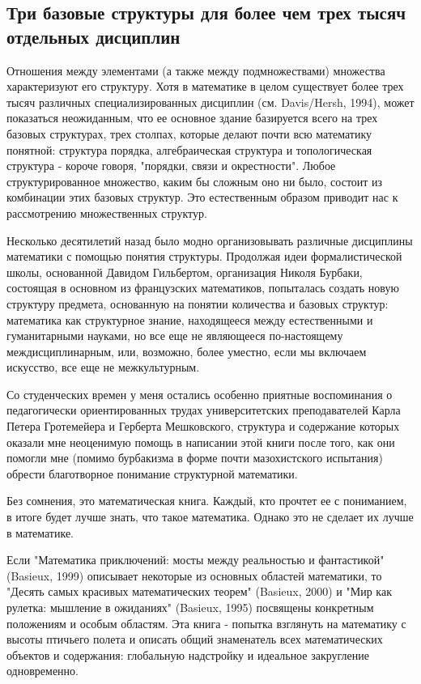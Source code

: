 \subsection{Три базовые структуры для более чем трех тысяч отдельных дисциплин}
Отношения между элементами (а также между подмножествами) множества характеризуют его структуру. Хотя в математике в целом существует более трех тысяч различных специализированных дисциплин (см. Davis/Hersh, 1994), может показаться неожиданным, что ее основное здание базируется всего на трех базовых структурах, трех столпах, которые делают почти всю математику понятной: структура порядка, алгебраическая структура и топологическая структура - короче говоря, "порядки, связи и окрестности". Любое структурированное множество, каким бы сложным оно ни было, состоит из комбинации этих базовых структур. Это естественным образом приводит нас к рассмотрению множественных структур.

Несколько десятилетий назад было модно организовывать различные дисциплины математики с помощью понятия структуры. Продолжая идеи формалистической школы, основанной Давидом Гильбертом, организация Николя Бурбаки, состоящая в основном из французских математиков, попыталась создать новую структуру предмета, основанную на понятии количества и базовых структур: математика как структурное знание, находящееся между естественными и гуманитарными науками, но все еще не являющееся по-настоящему междисциплинарным, или, возможно, более уместно, если мы включаем искусство, все еще не межкультурным.

Со студенческих времен у меня остались особенно приятные воспоминания о педагогически ориентированных трудах университетских преподавателей Карла Петера Гротемейера и Герберта Мешковского, структура и содержание которых оказали мне неоценимую помощь в написании этой книги после того, как они помогли мне (помимо бурбакизма в форме почти мазохистского испытания) обрести благотворное понимание структурной математики.

Без сомнения, это математическая книга. Каждый, кто прочтет ее с пониманием, в итоге будет лучше знать, что такое математика. Однако это не сделает их лучше в математике.

Если "Математика приключений: мосты между реальностью и фантастикой" (Basieux, 1999) описывает некоторые из основных областей математики, то "Десять самых красивых математических теорем" (Basieux, 2000) и "Мир как рулетка: мышление в ожиданиях" (Basieux, 1995) посвящены конкретным положениям и особым областям. Эта книга - попытка взглянуть на математику с высоты птичьего полета и описать общий знаменатель всех математических объектов и содержания: глобальную надстройку и идеальное закругление одновременно.

